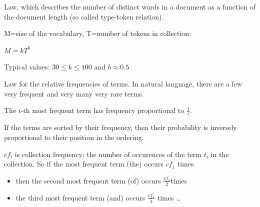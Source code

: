 \begin{breakbox}

Law, which describes the number of distinct words in a document as a function of the document length (so called type-token relation).

M=size of the vocabulary, T=number of tokens in collection:
\begin{center}
	$M=kT^b$
\end{center}

Typical values: $30 \leq k \leq 100$ and $b \approx 0.5$
\end{breakbox}

\begin{breakbox}

Law for the relative frequencies of terms. In natural language, there are a few very frequent and very many very rare terms.

\begin{center}
	The $i$-th most frequent term has frequency proportional to $\frac{1}{i}$.
\end{center}

If the terms are sorted by their frequency, then their probability is inversely proportional to their position in the ordering.

$cf_i$ is collection frequency: the number of occurences of the term $t_i$ in the collection. So if the most frequent term (the) occurs $cf_1$ times
\begin{itemize}
	\item then the second most frequent term (of) occurs
$\frac{cf_1}{2}$times
	\item the third most frequent term (and) occurs $\frac{cf_1}{3}$ times \ldots
\end{itemize}
\end{breakbox}